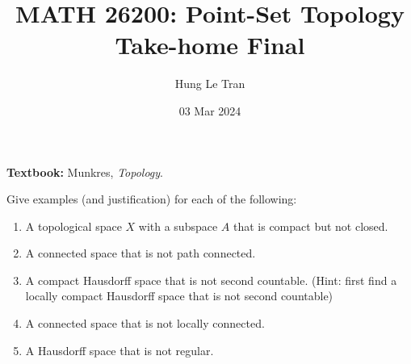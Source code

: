 \documentclass[a4paper, 10pt]{article}
\title{MATH 26200: Point-Set Topology \\ \large Take-home Final}
\date{03 Mar 2024}
\author{Hung Le Tran}
\begin{document}
\maketitle
\setcounter{section}{8}
\textbf{Textbook:} Munkres, \textit{Topology}.
\begin{problem} [\done]
    Give examples (and justification) for each of the following:
    \begin{enumerate}
    \item A topological space $X$ with a subspace $A$ that is compact but not closed.
    \item A connected space that is not path connected.
    \item A compact Hausdorff space that is not second countable. (Hint: first find a locally compact Hausdorff space that is not second countable)
    \item A connected space that is not locally connected.
    \item A Hausdorff space that is not regular.
    \end{enumerate}
\end{problem}
\end{document}
